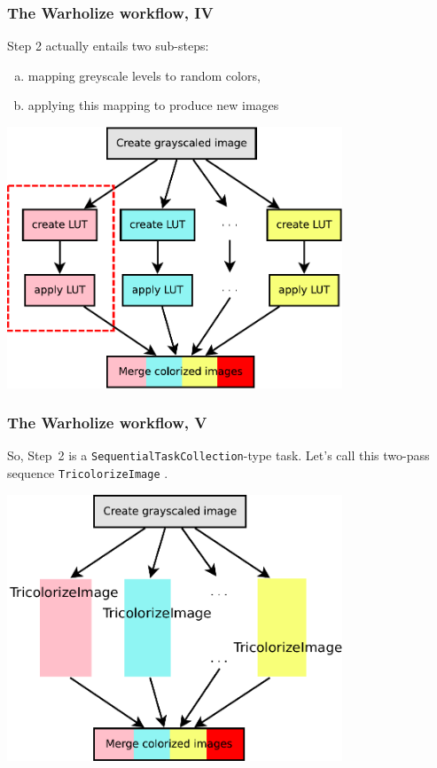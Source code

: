 \documentclass[english,serif,mathserif,usenames,dvipsnames]{beamer}
\begin{document}
\begin{frame}
  \frametitle{The Warholize workflow, IV}

  Step 2 actually entails two sub-steps:
  \begin{enumerate}[a)]
  \item mapping greyscale levels to random colors,
  \item applying this mapping to produce new images
  \end{enumerate}

  \+
  \includegraphics[width=0.75\textwidth]{fig/warholize-wkf2a}
\end{frame}


\begin{frame}
  \frametitle{The Warholize workflow, V}

  So, Step~2 is a \texttt{SequentialTaskCollection}-type task. Let's
  call this two-pass sequence \texttt{TricolorizeImage} .

  \+
  \includegraphics[width=0.75\textwidth]{fig/warholize-TricolorizeImage}
\end{frame}
\end{document}
